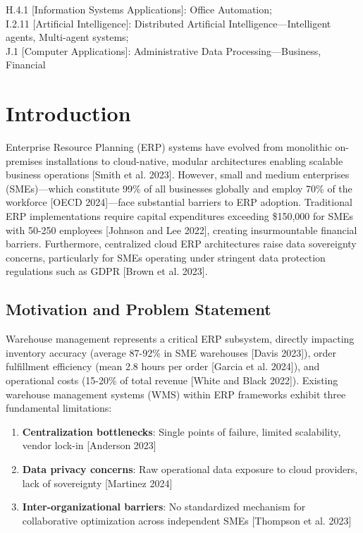 \documentclass[times,10pt,twocolumn]{jucs2e}
\begin{document}
\begin{classification}
H.4.1 [Information Systems Applications]: Office Automation;\\
I.2.11 [Artificial Intelligence]: Distributed Artificial Intelligence—Intelligent agents, Multi-agent systems;\\
J.1 [Computer Applications]: Administrative Data Processing—Business, Financial
\end{classification}


\section{Introduction}

Enterprise Resource Planning (ERP) systems have evolved from monolithic on-premises installations to cloud-native, modular architectures enabling scalable business operations [Smith et al. 2023]. However, small and medium enterprises (SMEs)—which constitute 99\% of all businesses globally and employ 70\% of the workforce [OECD 2024]—face substantial barriers to ERP adoption. Traditional ERP implementations require capital expenditures exceeding \$150,000 for SMEs with 50-250 employees [Johnson and Lee 2022], creating insurmountable financial barriers. Furthermore, centralized cloud ERP architectures raise data sovereignty concerns, particularly for SMEs operating under stringent data protection regulations such as GDPR [Brown et al. 2023].

\subsection{Motivation and Problem Statement}

Warehouse management represents a critical ERP subsystem, directly impacting inventory accuracy (average 87-92\% in SME warehouses [Davis 2023]), order fulfillment efficiency (mean 2.8 hours per order [Garcia et al. 2024]), and operational costs (15-20\% of total revenue [White and Black 2022]). Existing warehouse management systems (WMS) within ERP frameworks exhibit three fundamental limitations:

\begin{enumerate}
\item \textbf{Centralization bottlenecks}: Single points of failure, limited scalability, vendor lock-in [Anderson 2023]
\item \textbf{Data privacy concerns}: Raw operational data exposure to cloud providers, lack of sovereignty [Martinez 2024]
\item \textbf{Inter-organizational barriers}: No standardized mechanism for collaborative optimization across independent SMEs [Thompson et al. 2023]
\end{enumerate}
\end{document}
